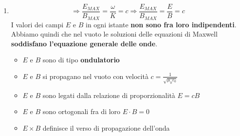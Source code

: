 \documentclass[../main.tex]{subfiles}
\begin{document}
\begin{enumerate}
		e
		$$\boxed{\frac{\partial^2 B}{\partial x^2}} = - \mu_0 \varepsilon_0 \frac{\partial}{\partial x} \left( \frac{\partial E}{\partial t} \right) = - \mu_0 \varepsilon_0 \frac{\partial}{\partial t} \left( \frac{\partial E}{\partial x} \right) = - \mu_0 \varepsilon_0 \frac{\partial}{\partial t} \left( - \frac{\partial B}{\partial t} \right) = \boxed{\mu_0 \varepsilon_0 \frac{\partial^2 B}{\partial t^2}}$$
		Sia $E$ che $B$ sono dunque soluzioni di equazioni nella forma dell’\textbf{equazione lineare delle onde}:
		$$\begin{gathered}
			\frac{\partial^2 E}{\partial x^2} = \mu_0 \varepsilon_0 \frac{\partial^2 E}{\partial t^2} \\
			\quad \\
			\frac{\partial^2 B}{\partial x^2} = \mu_0 \varepsilon_0 \frac{\partial^2 B}{\partial t^2}
		\end{gathered}
		\qquad \text{del tipo } \quad \frac{\partial^2 f}{\partial x^2} = \frac{1}{v^2} \frac{\partial^2 f}{\partial t^2}$$
		$$\Rightarrow v = \frac{1}{\sqrt{\mu_0 \varepsilon_0}} = \frac{1}{\sqrt{4 \pi \cdot 10^{-7} \frac{H}{m} \cdot 8.85 \cdot 10^{-12} \frac{F}{m}}} \approx 2.998 \cdot 10^8 \text{ m/s} = c \quad \textbf{Velocità Della Luce Nel Vuoto}$$
		Quindi possiamo dedurre che la \textbf{velocità di propagazione dell'onda elettromagnetica} ($c$) sia:
		$$c = \frac{1}{\sqrt{\mu_0 \varepsilon_0}}$$
		Essendo $E = E_{MAX} \cos(Kx - \omega t)$ e $B = B_{MAX} \cos(Kx - \omega t)$ dalle relazioni valide per le onde.\\
		$$c = \frac{\omega}{K} = \lambda \nu$$
		Inoltre da:
		$$\frac{\partial E}{\partial x} = - \frac{\partial B}{\partial t} \Rightarrow \quad - K E_{MAX}\cancel{ \sin(Kx - \omega t)} = - \omega B_{MAX} \cancel{\sin(Kx - \omega t)}$$
		\item $$\Rightarrow \frac{E_{MAX}}{B_{MAX}} = \frac{\omega}{K} = c \Rightarrow \frac{E_{MAX}}{B_{MAX}} = \frac{E}{B} = c$$
		I valori dei campi $E$ e $B$ in ogni istante \textbf{non sono fra loro indipendenti}.\\
		Abbiamo quindi che nel vuoto le soluzioni delle equazioni di Maxwell \textbf{soddisfano l’equazione generale delle onde}.
		\begin{itemize}
			\item $E$ e $B$ sono di tipo \textbf{ondulatorio} 
			\item $E$ e $B$ si propagano nel vuoto con velocità $c = \frac{1}{\sqrt{\mu_0 \varepsilon_0}}$
			\item $E$ e $B$ sono legati dalla relazione di proporzionalità $E = c B$
			\item $E$ e $B$ sono ortogonali fra di loro $E \cdot B = 0$
			\item $E \times B$ definisce il verso di propagazione dell'onda
		\end{itemize}
	\end{enumerate}
\end{document}

